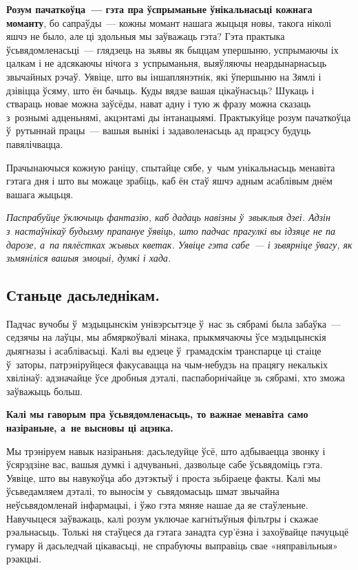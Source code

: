 \textbf{Розум пачаткоўца~--- гэта пра ўспрыманьне ўнікальнасьці кожнага моманту}, бо сапраўды~--- кожны момант нашага жыцьця новы, такога ніколі яшчэ не было, але ці здольныя мы заўважаць гэта? Гэта практыка ўсьвядомленасьці~--- глядзець на зьявы як быццам упершыню, успрымаючы іх цалкам і не адсякаючы нічога з~успрыманьня, выяўляючы неардынарнасьць звычайных рэчаў. Уявіце, што вы іншаплянэтнік, які ўпершыню на Зямлі і дзівіцца ўсяму, што ён бачыць. Куды вядзе вашая цікаўнасьць? Шукаць і ствараць новае можна заўсёды, нават адну і тую ж фразу можна сказаць з~рознымі адценьнямі, акцэнтамі ды інтанацыямі. Практыкуйце розум пачаткоўца ў~рутыннай працы~--- вашыя вынікі і задаволенасьць ад працэсу будуць павялічвацца. 


Прачынаючыся кожную раніцу, спытайце сябе, у~чым унікальнасьць менавіта гэтага дня і што вы можаце зрабіць, каб ён стаў яшчэ адным асаблівым днём вашага жыцьця.

\emph{Паспрабуйце ўключыць фантазію, каб дадаць навізны ў~звыклыя дзеі. Адзін з~настаўнікаў будызму прапануе ўявіць, што падчас прагулкі вы ідзяце не па дарозе, а~па пялёстках жывых кветак. Уявіце гэта сабе~--- і зьвярніце ўвагу, як зьмяніліся вашыя эмоцыі, думкі і хада.}

\subsection*{Станьце дасьледнікам.}

Падчас вучобы ў~мэдыцынскім унівэрсытэце ў~нас зь сябрамі была забаўка~--- седзячы на лаўцы, мы абмяркоўвалі мінака, прыкмячаючы ўсе мэдыцынскія дыягназы і асаблівасьці. Калі вы едзеце ў~грамадскім транспарце ці стаіце ў~заторы, патрэніруйцеся факусавацца на чым-небудзь на працягу некалькіх хвілінаў: адзначайце ўсе дробныя дэталі, паспаборнічайце зь сябрамі, хто зможа заўважыць больш.

\textbf{Калі мы гаворым пра ўсьвядомленасьць, то важнае менавіта само назіраньне, а~не высновы ці ацэнка.}

Мы трэніруем навык назіраньня: дасьледуйце ўсё, што адбываецца звонку і ўсярэдзіне вас, вашыя думкі і адчуваньні, дазвольце сабе ўсьвядоміць гэта. Уявіце, што вы навукоўца або дэтэктыў і проста зьбіраеце факты. Калі мы ўсьведамляем дэталі, то выносім у~сьвядомасьць шмат звычайна неўсьвядомленай інфармацыі, і ўжо гэта мяняе нашае да яе стаўленьне. Навучыцеся заўважаць, калі розум уключае кагнітыўныя фільтры і скажае рэальнасьць. Толькі ня стаўцеся да гэтага занадта сур'ёзна і захоўвайце пачуцьцё гумару й дасьледчай цікавасьці, не спрабуючы выправіць свае «няправільныя» рэакцыі.

